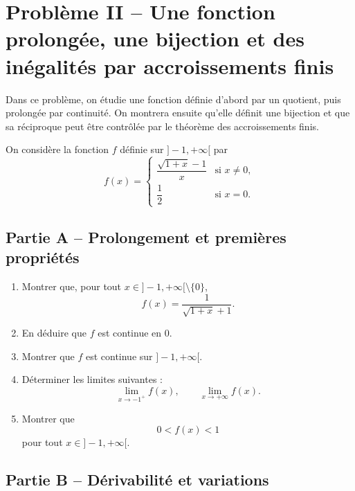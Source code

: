\documentclass[11pt,a4paper]{article}
\begin{document}

\section*{Problème II -- Une fonction prolongée, une bijection et des inégalités par accroissements finis}

Dans ce problème, on étudie une fonction définie d'abord par un quotient, puis prolongée par continuité. On montrera ensuite qu'elle définit une bijection et que sa réciproque peut être contrôlée par le théorème des accroissements finis.

On considère la fonction \(f\) définie sur \(]-1,+\infty[\) par
\[
f(x)=
\begin{cases}
\dfrac{\sqrt{1+x}-1}{x} & \text{si } x\neq 0,\\[1.2em]
\dfrac12 & \text{si } x=0.
\end{cases}
\]


\subsection*{Partie A -- Prolongement et premières propriétés}

\begin{enumerate}
    \item Montrer que, pour tout \(x\in]-1,+\infty[\setminus\{0\}\),
    \[
    f(x)=\frac{1}{\sqrt{1+x}+1}.
    \]

    \item En déduire que \(f\) est continue en \(0\).

    \item Montrer que \(f\) est continue sur \(]-1,+\infty[\).

    \item Déterminer les limites suivantes :
    \[
    \lim_{x\to -1^+} f(x),
    \qquad
    \lim_{x\to +\infty} f(x).
    \]

    \item Montrer que
    \[
    0<f(x)<1
    \]
    pour tout \(x\in]-1,+\infty[\).
\end{enumerate}


\subsection*{Partie B -- Dérivabilité et variations}
\end{document}
